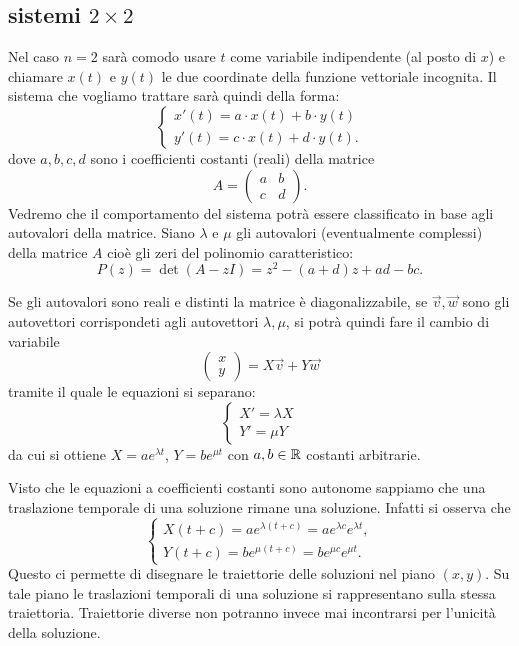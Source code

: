\subsection{sistemi $2\times 2$}

Nel caso $n=2$ sarà comodo usare $t$ come variabile indipendente (al posto di $x$)
e chiamare $x(t)$ e $y(t)$ le due coordinate della funzione vettoriale incognita.
Il sistema che vogliamo trattare sarà quindi della forma:
\[
\begin{cases}
  x'(t) = a\cdot  x(t) + b \cdot y(t)\\
  y'(t) = c\cdot  x(t) + d \cdot y(t).
\end{cases}
\]
dove $a,b,c,d$ sono i coefficienti costanti (reali) della matrice
\[
   A = \begin{pmatrix}
   a & b \\
   c & d
   \end{pmatrix}.
\]
Vedremo che il comportamento del sistema potrà essere classificato in
base agli autovalori della matrice.
Siano $\lambda$ e $\mu$ gli autovalori (eventualmente complessi)
della matrice $A$ cioè gli zeri del polinomio caratteristico:
\[
 P(z)
 = \det (A - z I)
 = z^2 - (a+d) z + ad - bc.
\]

Se gli autovalori sono reali e distinti la matrice è
diagonalizzabile, se $\vec v, \vec w$ sono gli autovettori corrispondeti
agli autovettori $\lambda, \mu$, si potrà quindi fare il cambio
di variabile
\[
\begin{pmatrix} x \\ y \end{pmatrix}
= X \vec v + Y \vec w
\]
tramite il quale le equazioni si separano:
\[
  \begin{cases}
  X' = \lambda X \\
  Y' = \mu Y
  \end{cases}
\]
da cui si ottiene $X = a e^{\lambda t}$, $Y= b e^{\mu t}$
con $a,b\in \mathbb R$ costanti arbitrarie.

Visto che le equazioni a coefficienti costanti sono autonome
sappiamo che una traslazione temporale di una soluzione rimane
una soluzione. Infatti si osserva che
\[
\begin{cases}
  X(t+c) = a e^{\lambda (t+c)} = a e^{\lambda c} e^{\lambda t}, \\
  Y(t+c) = b e^{\mu (t+c)} = b e^{\mu c} e^{\mu t}.
\end{cases}
\]
Questo ci permette di disegnare le traiettorie delle soluzioni
nel piano $(x,y)$. Su tale piano le traslazioni temporali
di una soluzione si rappresentano sulla stessa traiettoria.
Traiettorie diverse non potranno invece mai incontrarsi
per l'unicità della soluzione.

